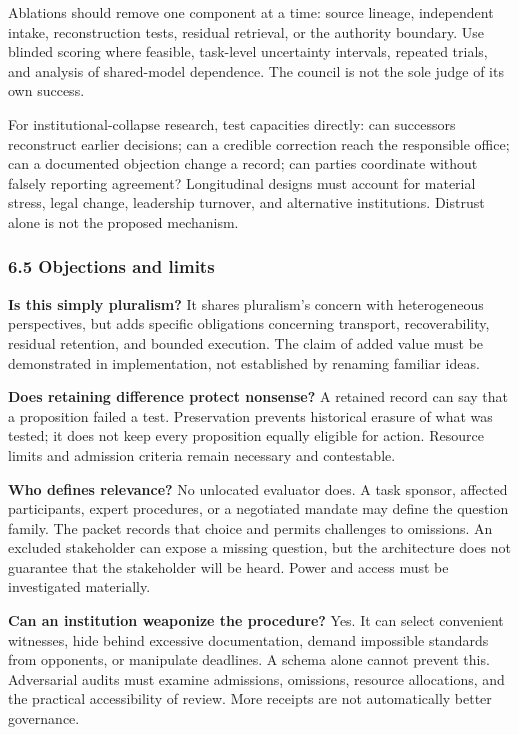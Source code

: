 \documentclass[
  10pt,
]{article}
\begin{document}
Ablations should remove one component at a time: source lineage, independent intake, reconstruction tests, residual retrieval, or the authority boundary. Use blinded scoring where feasible, task-level uncertainty intervals, repeated trials, and analysis of shared-model dependence. The council is not the sole judge of its own success.

For institutional-collapse research, test capacities directly: can successors reconstruct earlier decisions; can a credible correction reach the responsible office; can a documented objection change a record; can parties coordinate without falsely reporting agreement? Longitudinal designs must account for material stress, legal change, leadership turnover, and alternative institutions. Distrust alone is not the proposed mechanism.

\subsubsection{6.5 Objections and limits}\label{objections-and-limits}

\textbf{Is this simply pluralism?} It shares pluralism's concern with heterogeneous perspectives, but adds specific obligations concerning transport, recoverability, residual retention, and bounded execution. The claim of added value must be demonstrated in implementation, not established by renaming familiar ideas.

\textbf{Does retaining difference protect nonsense?} A retained record can say that a proposition failed a test. Preservation prevents historical erasure of what was tested; it does not keep every proposition equally eligible for action. Resource limits and admission criteria remain necessary and contestable.

\textbf{Who defines relevance?} No unlocated evaluator does. A task sponsor, affected participants, expert procedures, or a negotiated mandate may define the question family. The packet records that choice and permits challenges to omissions. An excluded stakeholder can expose a missing question, but the architecture does not guarantee that the stakeholder will be heard. Power and access must be investigated materially.

\textbf{Can an institution weaponize the procedure?} Yes. It can select convenient witnesses, hide behind excessive documentation, demand impossible standards from opponents, or manipulate deadlines. A schema alone cannot prevent this. Adversarial audits must examine admissions, omissions, resource allocations, and the practical accessibility of review. More receipts are not automatically better governance.
\end{document}

